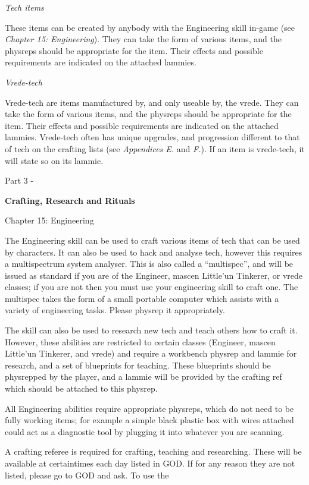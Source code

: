 \documentclass{scrbook}
\begin{document}
\textit{Tech items}

These items can be created by anybody with the Engineering skill in-game (see \textit{Chapter 15: Engineering}). They can take the form of various items, and the physreps should be appropriate for the item. Their effects and possible requirements are indicated on the attached lammies.

\textit{Vrede-tech}

Vrede-tech are items manufactured by, and only useable by, the vrede. They can take the form of various items, and the physreps should be appropriate for the item. Their effects and possible requirements are indicated on the attached lammies. Vrede-tech often has unique upgrades, and progression different to that of tech on the crafting lists (see \textit{Appendices E.} and \textit{F.}). If an item is vrede-tech, it will state so on its lammie.

Part 3 -

\textbf{Crafting, Research and Rituals}

Chapter 15: Engineering

The Engineering skill can be used to craft various items of tech that can be used by characters. It can also be used to hack and analyse tech, however this requires a multispectrum system analyser. This is also called a ``multispec'', and will be issued as standard if you are of the Engineer, mascen Little'un Tinkerer, or vrede classes; if you are not then you must use your engineering skill to craft one. The multispec takes the form of a small portable computer which assists with a variety of engineering tasks. Please physrep it appropriately.

The skill can also be used to research new tech and teach others how to craft it. However, these abilities are restricted to certain classes (Engineer, mascen Little'un Tinkerer, and vrede) and require a workbench physrep and lammie for research, and a set of blueprints for teaching. These blueprints should be physrepped by the player, and a lammie will be provided by the crafting ref which should be attached to this physrep.

All Engineering abilities require appropriate physreps, which do not need to be fully working items; for example a simple black plastic box with wires attached could act as a diagnostic tool by plugging it into whatever you are scanning.

A crafting referee is required for crafting, teaching and researching. These will be available at certaintimes each day listed in GOD. If for any reason they are not listed, please go to GOD and ask. To use the
\end{document}
